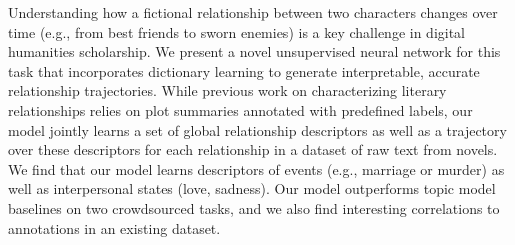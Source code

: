 Understanding how a fictional relationship between two characters changes over time (e.g., from best friends to sworn enemies) is a key challenge in digital humanities scholarship. We present a novel unsupervised neural network for this task that incorporates dictionary learning to generate interpretable, accurate relationship trajectories. While previous work on characterizing literary relationships relies on plot summaries annotated with predefined labels, our model jointly learns a set of global relationship descriptors as well as a trajectory over these descriptors for each relationship in a dataset of raw text from novels. We find that our model learns descriptors of events (e.g., marriage or murder) as well as interpersonal states (love, sadness). Our model outperforms topic model baselines on two crowdsourced tasks, and we also find interesting correlations to annotations in an existing dataset.
